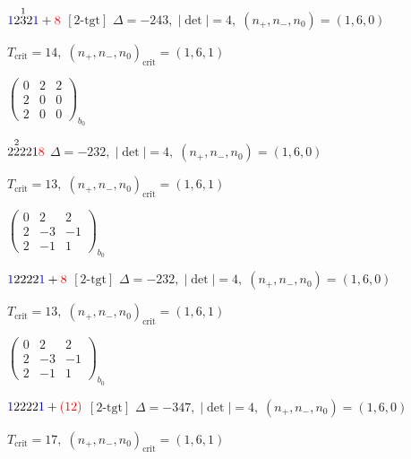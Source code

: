 \documentclass[10pt]{article}
\begin{document}
\smallskip

$\textcolor{blue}{1}2\overset{1}{3}2\textcolor{blue}{1}+\textcolor{red}{8}$ $\scriptstyle [2\text{-tgt}]$ \quad $\Delta=-243,\; |\det|=4,\; (n_+,n_-,n_0)=(1,6,0)$

\hspace{1em}$T_{\text{crit}}=14,\; (n_+,n_-,n_0)_{\text{crit}}=(1,6,1)$

\hspace{2em}$\left(\begin{smallmatrix}0 & 2 & 2 \\ 2 & 0 & 0 \\ 2 & 0 & 0\end{smallmatrix}\right)_{\!b_0}$

\smallskip

$2\overset{2}{2}221\textcolor{red}{8}$ \quad $\Delta=-232,\; |\det|=4,\; (n_+,n_-,n_0)=(1,6,0)$

\hspace{1em}$T_{\text{crit}}=13,\; (n_+,n_-,n_0)_{\text{crit}}=(1,6,1)$

\hspace{2em}$\left(\begin{smallmatrix}0 & 2 & 2 \\ 2 & -3 & -1 \\ 2 & -1 & 1\end{smallmatrix}\right)_{\!b_0}$

\smallskip

$\textcolor{blue}{1}2222\textcolor{blue}{1}+\textcolor{red}{8}$ $\scriptstyle [2\text{-tgt}]$ \quad $\Delta=-232,\; |\det|=4,\; (n_+,n_-,n_0)=(1,6,0)$

\hspace{1em}$T_{\text{crit}}=13,\; (n_+,n_-,n_0)_{\text{crit}}=(1,6,1)$

\hspace{2em}$\left(\begin{smallmatrix}0 & 2 & 2 \\ 2 & -3 & -1 \\ 2 & -1 & 1\end{smallmatrix}\right)_{\!b_0}$

$\textcolor{blue}{1}2222\textcolor{blue}{1}+\textcolor{red}{(12)}$ $\scriptstyle [2\text{-tgt}]$ \quad $\Delta=-347,\; |\det|=4,\; (n_+,n_-,n_0)=(1,6,0)$

\hspace{1em}$T_{\text{crit}}=17,\; (n_+,n_-,n_0)_{\text{crit}}=(1,6,1)$
\end{document}
